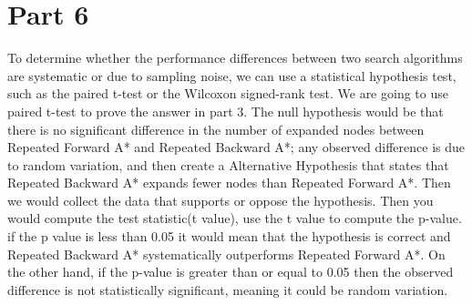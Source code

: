 \documentclass[12pt]{article}
\begin{document}
\section*{Part 6}
To determine whether the performance differences between two search algorithms are systematic or due to sampling noise, we can use a statistical hypothesis test, such as the paired t-test or the Wilcoxon signed-rank test. We are going to use paired t-test to prove the answer in part 3. The null hypothesis would be that there is no significant difference in the number of expanded nodes between Repeated Forward A* and Repeated Backward A*; any observed difference is due to random variation, and then create a Alternative Hypothesis that states that Repeated Backward A* expands fewer nodes than Repeated Forward A*. Then we would collect the data that supports or oppose the hypothesis. Then you would compute the test statistic(t value), use the t value to compute the p-value. if the p value is less than 0.05 it would mean that the hypothesis is correct and Repeated Backward A* systematically outperforms Repeated Forward A*. On the other hand, if the p-value is greater than or equal to 0.05 then the observed difference is not statistically significant, meaning it could be random variation.
\end{document}
